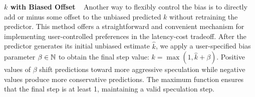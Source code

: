 \textbf{$k$ with Biased Offset} ~ Another way to flexibly control the bias is to directly add or minus some offset to the unbiased predicted $k$ without retraining the predictor. This method offers a straightforward and convenient mechanism for implementing user-controlled preferences in the latency-cost tradeoff. After the predictor generates its initial unbiased estimate $\hat{k}$, we apply a user-specified bias parameter $\beta \in {\mathbb{N}}$ to obtain the final step value: $k = \max(1, \hat{k} + \beta)$. Positive values of $\beta$ shift predictions toward more aggressive speculation while negative values produce more conservative predictions. The maximum function ensures that the final step is at least 1, maintaining a valid speculation step.

